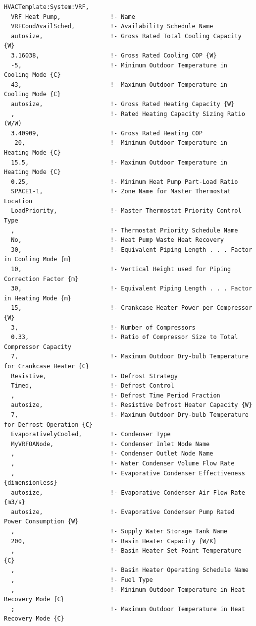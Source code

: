 \begin{lstlisting}
HVACTemplate:System:VRF,
  VRF Heat Pump,              !- Name
  VRFCondAvailSched,          !- Availability Schedule Name
  autosize,                   !- Gross Rated Total Cooling Capacity {W}
  3.16038,                    !- Gross Rated Cooling COP {W}
  -5,                         !- Minimum Outdoor Temperature in Cooling Mode {C}
  43,                         !- Maximum Outdoor Temperature in Cooling Mode {C}
  autosize,                   !- Gross Rated Heating Capacity {W}
  ,                           !- Rated Heating Capacity Sizing Ratio (W/W)
  3.40909,                    !- Gross Rated Heating COP
  -20,                        !- Minimum Outdoor Temperature in Heating Mode {C}
  15.5,                       !- Maximum Outdoor Temperature in Heating Mode {C}
  0.25,                       !- Minimum Heat Pump Part-Load Ratio
  SPACE1-1,                   !- Zone Name for Master Thermostat Location
  LoadPriority,               !- Master Thermostat Priority Control Type
  ,                           !- Thermostat Priority Schedule Name
  No,                         !- Heat Pump Waste Heat Recovery
  30,                         !- Equivalent Piping Length . . . Factor in Cooling Mode {m}
  10,                         !- Vertical Height used for Piping Correction Factor {m}
  30,                         !- Equivalent Piping Length . . . Factor in Heating Mode {m}
  15,                         !- Crankcase Heater Power per Compressor {W}
  3,                          !- Number of Compressors
  0.33,                       !- Ratio of Compressor Size to Total Compressor Capacity
  7,                          !- Maximum Outdoor Dry-bulb Temperature for Crankcase Heater {C}
  Resistive,                  !- Defrost Strategy
  Timed,                      !- Defrost Control
  ,                           !- Defrost Time Period Fraction
  autosize,                   !- Resistive Defrost Heater Capacity {W}
  7,                          !- Maximum Outdoor Dry-bulb Temperature for Defrost Operation {C}
  EvaporativelyCooled,        !- Condenser Type
  MyVRFOANode,                !- Condenser Inlet Node Name
  ,                           !- Condenser Outlet Node Name
  ,                           !- Water Condenser Volume Flow Rate
  ,                           !- Evaporative Condenser Effectiveness {dimensionless}
  autosize,                   !- Evaporative Condenser Air Flow Rate {m3/s}
  autosize,                   !- Evaporative Condenser Pump Rated Power Consumption {W}
  ,                           !- Supply Water Storage Tank Name
  200,                        !- Basin Heater Capacity {W/K}
  ,                           !- Basin Heater Set Point Temperature {C}
  ,                           !- Basin Heater Operating Schedule Name
  ,                           !- Fuel Type
  ,                           !- Minimum Outdoor Temperature in Heat Recovery Mode {C}
  ;                           !- Maximum Outdoor Temperature in Heat Recovery Mode {C}
\end{lstlisting}

